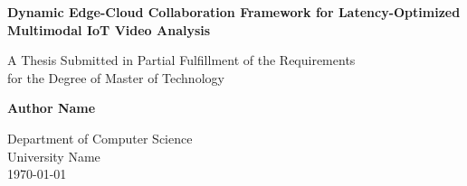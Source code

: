 \documentclass[12pt, a4paper]{report}
\begin{document}
\begin{titlepage}
    \begin{center}
        \vspace*{1cm}
            
        \Huge
        \textbf{Dynamic Edge-Cloud Collaboration Framework for Latency-Optimized Multimodal IoT Video Analysis}
            
        \vspace{1.5cm}
            
        \Large
        A Thesis Submitted in Partial Fulfillment of the Requirements \\
        for the Degree of Master of Technology
            
        \vspace{1.5cm}
            
        \textbf{Author Name} %
            
        \vfill
            
        \Large
        Department of Computer Science\\
        University Name\\ %
        \today
            
    \end{center}
\end{titlepage}

\tableofcontents
\listoffigures
\listoftables
\newpage
\end{document}

